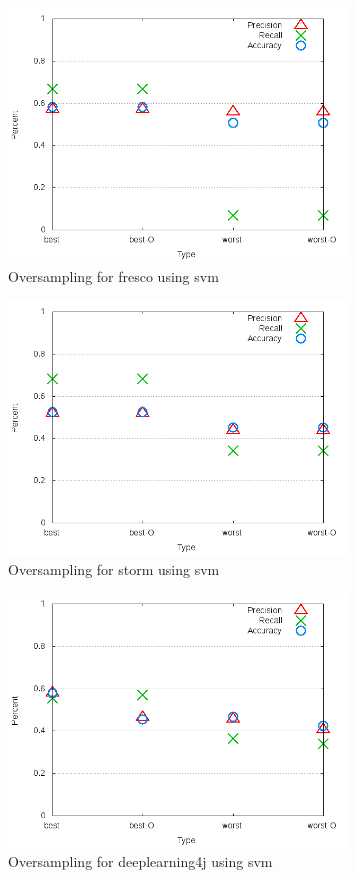 \begin{figure}[!ht]
    \centering
        \includegraphics[width=0.8\textwidth]{images/svm/test_4/fresco_sample_range}
        \caption{Oversampling for fresco using \gls{svm}}
        \label{fig:test_4_fresco_svm}
\end{figure}

\begin{figure}[!ht]
    \centering
        \includegraphics[width=0.8\textwidth]{images/svm/test_4/storm_sample_range}
        \caption{Oversampling for storm using \gls{svm}}
        \label{fig:test_4_storm_svm}
\end{figure}

\begin{figure}[!ht]
    \centering
        \includegraphics[width=0.8\textwidth]{images/svm/test_4/deeplearning4j_sample_range}
    \caption{Oversampling for deeplearning4j using \gls{svm}}
    \label{fig:test_4_deeplearning4j_svm}
\end{figure}


